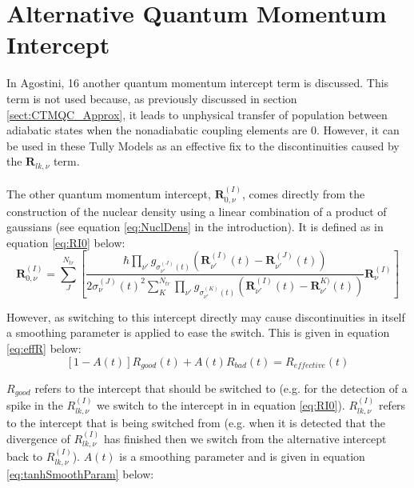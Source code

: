 \section{Alternative Quantum Momentum Intercept}
\label{ap:AltIntercept}
In Agostini, 16 \cite{agostini_quantum-classical_2016} another quantum momentum intercept term is discussed. This term is not used because, as previously discussed in section \ref{sect:CTMQC_Approx}, it leads to unphysical transfer of population between adiabatic states when the nonadiabatic coupling elements are 0. However, it can be used in these Tully Models as an effective fix to the discontinuities caused by the $\mathbf{R}_{lk, \nu}$ term.
\\\\
The other quantum momentum intercept, $\mathbf{R}_{0, \nu}^{(I)}$, comes directly from the construction of the nuclear density using a linear combination of a product of gaussians (see equation \eqref{eq:NuclDens} in the introduction). It is defined as in equation \eqref{eq:RI0} below:
\begin{equation}
    \mathbf{R}_{0, \nu}^{(I)} = \sum_{J}^{N_{tr}} \left[ \frac{\hbar          \prod_{\nu'}                                                                  g_{\sigma_{\nu'}^{(J)}(t)}\left(\mathbf{R}_{\nu'}^{(I)}(t) -                  \mathbf{R}_{\nu'}^{(J)}(t)\right)}   {2                                       \sigma_{\nu}^{(J)}(t)^2\sum_{K}^{N_{tr}}\prod_{\nu'}                                                                                                        g_{\sigma_{\nu'}^{(K)}(t)}\left(\mathbf{R}_{\nu'}^{(I)}(t) -                  \mathbf{R}_{\nu'}^{K)}(t)\right)} \mathbf{R}_{\nu}^{(I)} \right]
    \label{eq:RI0}
\end{equation}

However, as switching to this intercept directly may cause discontinuities in itself a smoothing parameter is applied to ease the switch. This is given in equation \eqref{eq:effR} below:
\begin{equation}
	\left[ 1 - A(t) \right] R_{good}(t) + A(t)R_{bad}(t) = R_{effective}(t)
	\label{eq:effR}
\end{equation}

$R_{good}$ refers to the intercept that should be switched to (e.g. for the detection of a spike in the $R_{lk, \nu}^{(I)}$ we switch to the intercept in in equation \eqref{eq:RI0}). $R_{lk, \nu}^{(I)}$ refers to the intercept that is being switched from (e.g. when it is detected that the divergence of $R_{lk, \nu}^{(I)}$ has finished then we switch from the alternative intercept back to $R_{lk, \nu}^{(I)}$). $A(t)$ is a smoothing parameter and is given in equation \eqref{eq:tanhSmoothParam} below:


